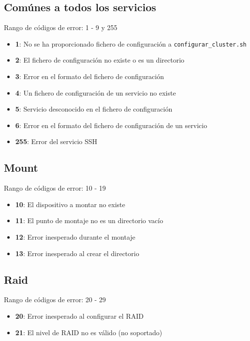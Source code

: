 \documentclass[12pt,a4paper, spanish]{article}
\begin{document}
\subsection{Comúnes a todos los servicios}
Rango de códigos de error: 1 - 9 y 255
\begin{itemize}
\item \textbf{1}: No se ha proporcionado fichero de configuración a \texttt{configurar\_cluster.sh}
\item \textbf{2}: El fichero de configuración no existe o es un directorio
\item \textbf{3}: Error en el formato del fichero de configuración
\item \textbf{4}: Un fichero de configuración de un servicio no existe
\item \textbf{5}: Servicio desconocido en el fichero de configuración
\item \textbf{6}: Error en el formato del fichero de configuración de un servicio
\item \textbf{255}: Error del servicio SSH
\end{itemize}

\subsection{Mount}
Rango de códigos de error: 10 - 19
\begin{itemize}
\item \textbf{10}: El dispositivo a montar no existe
\item \textbf{11}: El punto de montaje no es un directorio vacío
\item \textbf{12}: Error inesperado durante el montaje
\item \textbf{13}: Error inesperado al crear el directorio
\end{itemize}

\subsection{Raid}
Rango de códigos de error: 20 - 29
\begin{itemize}
\item \textbf{20}: Error inesperado al configurar el RAID
\item \textbf{21}: El nivel de RAID no es válido (no soportado)
\end{itemize}
\end{document}
